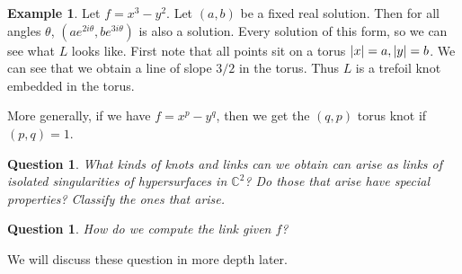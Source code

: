 \documentclass[leqno, openany]{memoir}
\DeclarePairedDelimiter{\abs}{\lvert}{\rvert}
\newtheorem{quest}[thm]{Question}
\theoremstyle{definition}
\newtheorem{exm}[thm]{Example}
\theoremstyle{remark}
\theoremstyle{plain}
\theoremstyle{definition}
\theoremstyle{remark}
\renewcommand{\C}{\mathbb{C}}
\begin{document}
\begin{exm}
    Let $f = x^3 - y^2$. Let $(a,b)$ be a fixed real solution. Then for all angles $\theta$, $(ae^{2i\theta}, be^{3i\theta})$ is also a solution. Every solution of this form, so we can see what $L$ looks like. First note that all points sit on a torus $\abs{x} = a, \abs{y} = b$. We can see that we obtain a line of slope $3/2$ in the torus. Thus $L$ is a trefoil knot embedded in the torus.

    More generally, if we have $f = x^p - y^q$, then we get the $(q,p)$ torus knot if $(p,q) = 1$. 
\end{exm}

\begin{quest}
    What kinds of knots and links can we obtain can arise as links of isolated singularities of hypersurfaces in $\C^2$? Do those that arise have special properties? Classify the ones that arise.
\end{quest}

\begin{quest}
    How do we compute the link given $f$?
\end{quest}

We will discuss these question in more depth later.
\end{document}
